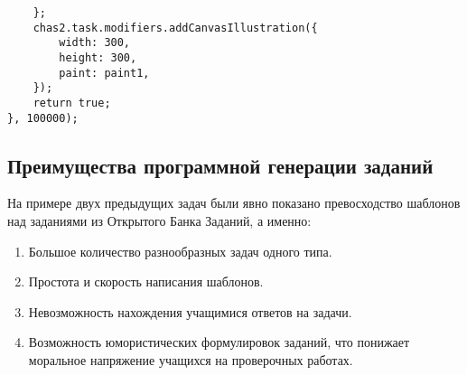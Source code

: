 \begin{enumerate}
\begin{lstlisting}
	};
	chas2.task.modifiers.addCanvasIllustration({
		width: 300,
		height: 300,
		paint: paint1,
	});
	return true;
}, 100000);
        \end{lstlisting}
\end{enumerate}
\subsection{Преимущества программной генерации заданий}
На примере двух предыдущих задач были явно показано превосходство шаблонов над заданиями из Открытого Банка Заданий, а именно:
\begin{enumerate}
    \item Большое количество разнообразных задач одного типа.
    \item Простота и скорость написания шаблонов.
    \item Невозможность нахождения учащимися ответов на задачи.
    \item Возможность юмористических формулировок заданий, что понижает моральное напряжение учащихся на проверочных работах.%
\end{enumerate}

